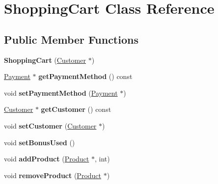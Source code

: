 \hypertarget{classShoppingCart}{}\section{Shopping\+Cart Class Reference}
\label{classShoppingCart}
\subsection*{Public Member Functions}
\begin{DoxyCompactItemize}
\item 
\mbox{\label{classShoppingCart_af7a004471b1321cd7ee3b725be7bc7d7}} 
{\bfseries Shopping\+Cart} (\hyperlink{classCustomer}{Customer} $\ast$)
\item 
\mbox{\label{classShoppingCart_ad8b993ad16c3e9c741bba48ede71d37a}} 
\hyperlink{classPayment}{Payment} $\ast$ {\bfseries get\+Payment\+Method} () const
\item 
\mbox{\label{classShoppingCart_a1648a74b6b51553740a964d39732f62a}} 
void {\bfseries set\+Payment\+Method} (\hyperlink{classPayment}{Payment} $\ast$)
\item 
\mbox{\label{classShoppingCart_a21f92d071d2ce35e03175969ce82da79}} 
\hyperlink{classCustomer}{Customer} $\ast$ {\bfseries get\+Customer} () const
\item 
\mbox{\label{classShoppingCart_afa31abf8f6244304419f4e6caf3b109c}} 
void {\bfseries set\+Customer} (\hyperlink{classCustomer}{Customer} $\ast$)
\item 
\mbox{\label{classShoppingCart_a2ed167d69492c61daf08754b4e3f99cf}} 
void {\bfseries set\+Bonus\+Used} ()
\item 
\mbox{\label{classShoppingCart_afcab6367adfc0be9e37dd037a43b4ce2}} 
void {\bfseries add\+Product} (\hyperlink{classProduct}{Product} $\ast$, int)
\item 
\mbox{\label{classShoppingCart_ad82371a6788905b99e6a03e3cd359242}} 
void {\bfseries remove\+Product} (\hyperlink{classProduct}{Product} $\ast$)
\item 

\end{DoxyCompactItemize}
